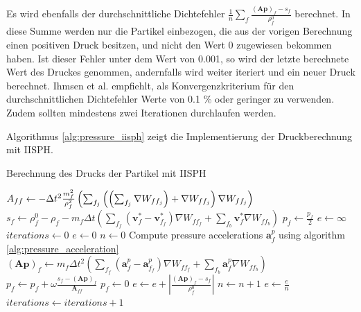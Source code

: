 \documentclass[11pt,
a4paper,
parskip=half, %
BCOR=10mm, %
english,
ngerman]{scrreprt}
\begin{document}
Es wird ebenfalls der durchschnittliche Dichtefehler $\frac{1}{n} \sum_{f} \frac{(\textbf{A}\textbf{p})_f - s_f}{\rho_f^0}$ berechnet.
In diese Summe werden nur die Partikel einbezogen, die aus der vorigen Berechnung einen positiven Druck besitzen, und nicht den Wert 0 zugewiesen bekommen haben.
Ist dieser Fehler unter dem Wert von 0.001, so wird der letzte berechnete Wert des Druckes genommen, andernfalls wird weiter iteriert und ein neuer Druck berechnet.
Ihmsen et al. \cite{ihmsen_implicit_2014} empfiehlt, als Konvergenzkriterium für den durchschnittlichen Dichtefehler Werte von 0.1 \% oder geringer zu verwenden.
Zudem sollten mindestens zwei Iterationen durchlaufen werden.

Algorithmus \ref{alg:pressure_iisph} zeigt die Implementierung der Druckberechnung mit IISPH.

\begin{algorithm}
    \caption{Berechnung des Drucks der Partikel mit IISPH}
    \label{alg:pressure_iisph}
    \begin{algorithmic}[1]
            \State $A_{ff} \gets - \Delta t^2 \frac{m_f^2}{\rho_f^2} \left(\sum_{f_j} \left(\Bigl(\sum_{f_j} \nabla W_{ff_j}\Bigr) + \nabla W_{ff_j}\right) \nabla W_{ff_j}\right)$
            \State $s_f \gets \rho_f^0 - \rho_f - m_f \Delta t \left(\sum_{f_f}(\textbf{v}_f^* - \textbf{v}_{f_f}^*) \nabla W_{ff_f} + \sum_{f_b}\textbf{v}_f^* \nabla W_{ff_b}\right)$
            \State $p_f \gets \frac{p_f}{2}$
        \EndFor
         \State $e \gets \infty$
         \State $iterations \gets 0$
            \State $e \gets 0$
            \State $n \gets 0$
            \State Compute pressure accelerations $\textbf{a}_f^p$ using algorithm \ref{alg:pressure_acceleration}
                \State $(\textbf{A}\textbf{p})_f \gets m_f \Delta t^2\left(\sum_{f_f}(\textbf{a}_f^p - \textbf{a}_{f_f}^p) \nabla W_{ff_f} + \sum_{f_b}\textbf{a}_f^p \nabla W_{ff_b}\right)$
                    \State $p_f \gets p_f + \omega \frac{s_f - (\textbf{A}\textbf{p})_f}{\textbf{A}_{ff}}$
                        \State $p_f \gets 0$
                    \Else
                        \State $e \gets e + \left\vert\frac{(\textbf{A}\textbf{p})_f - s_f}{\rho_f^0} \right\vert$
                        \State $n \gets n + 1$
                    \EndIf
                \EndIf
            \EndFor
            \State $e \gets \frac{e}{n}$
            \State $iterations \gets iterations + 1$
        \EndWhile
    \end{algorithmic}
    \end{algorithm}
\end{document}
